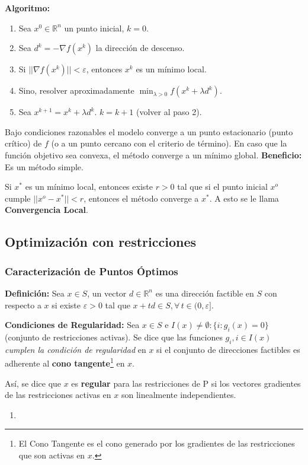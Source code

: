 \documentclass{article}
\begin{document}
\textbf{Algoritmo:}

\begin{enumerate}
    \item Sea $x^0 \in \mathbb{R}^n$ un punto inicial, $k=0$.
    \item Sea $d^k = -\nabla f(x^k)$ la dirección de descenso.
    \item Si $||\nabla f(x^k)|| < \varepsilon$, entonces $x^k$ es un mínimo local.
    \item Sino, resolver aproximadamente $\min_{\lambda>0} f(x^k + \lambda d^k)$.
    \item Sea $x^{k+1}=x^k + \lambda d^k$. $k = k+1$ (volver al paso 2).
\end{enumerate}

Bajo condiciones razonables el modelo converge a un punto estacionario (punto crítico) de $f$ (o a un punto cercano con el criterio de término). En caso que la función objetivo sea convexa, el método converge a un mínimo global. \textbf{Beneficio:} Es un método simple.

Si $x^*$ es un mínimo local, entonces existe $r>0$ tal que si el punto inicial $x^o$ cumple $||x^o - x^*|| < r$, entonces el método converge a $x^*$. A esto se le llama \textbf{Convergencia Local}.

\subsection{Optimizaci\'on con restricciones}

\subsubsection{Caracterización de Puntos Óptimos}

\textbf{Definición:} Sea $x \in S$, un vector $d \in \mathbb{R}^n$ es una dirección factible en $S$ con respecto a $x$ si existe $\varepsilon > 0$ tal que $x + td \in S, \forall \, t \in (0, \varepsilon]$.

\textbf{Condiciones de Regularidad:} Sea $x \in S$ e $I(x) \neq \emptyset: \{i:g_i(x) = 0\}$ (conjunto de restricciones activas). Se dice que las funciones $g_i, i \in I(x)$ \textit{cumplen la condición de regularidad} en $x$ si el conjunto de direcciones factibles es adherente al \textbf{cono tangente}\footnote{El Cono Tangente es el cono generado por los gradientes de las restricciones que son activas en $x$.} en $x$.

Así, se dice que $x$ es \textbf{regular} para las restricciones de P si los vectores gradientes de las restricciones activas en $x$ son linealmente independientes.
\begin{enumerate}
    \item 
\end{enumerate}
\end{document}
